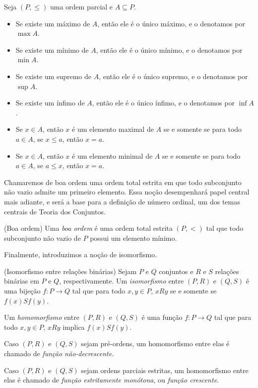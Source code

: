 \begin{proposition}[$\BST$]\label{prop:propriedadesBasicasDeOrdens}
    Seja $(P, \leq)$ uma ordem parcial e $A \subseteq P$.
    \begin{itemize}
        \item Se existe um máximo de $A$, então ele é o único máximo, e o denotamos por $\max A$.
        \item Se existe um mínimo de $A$, então ele é o único mínimo, e o denotamos por $\min A$.
        \item Se existe um supremo de $A$, então ele é o único supremo, e o denotamos por $\sup A$.
        \item Se existe um ínfimo de $A$, então ele é o único ínfimo, e o denotamos por $\inf A$.
        \item Se $x \in A$, então $x$ é um elemento maximal de $A$ se e somente se para todo $a \in A$, se $x \leq a$, então $x=a$.
        \item Se $x \in A$, então $x$ é um elemento minimal de $A$ se e somente se para todo $a \in A$, se $a \leq x$, então $x=a$.
    \end{itemize}
\end{proposition}
Chamaremos de boa ordem uma ordem total estrita em que todo subconjunto não vazio admite um primeiro elemento.
Essa noção desempenhará papel central mais adiante, e será a base para a definição de número ordinal, um dos temas centrais de Teoria dos Conjuntos.
\begin{definition}[$\BST$](Boa ordem)\label{def:boaOrdem}
    Uma \emph{boa ordem} é uma ordem total estrita $(P, <)$ tal que todo subconjunto não vazio de $P$ possui um elemento mínimo.
\end{definition}
Finalmente, introduzimos a noção de isomorfismo.
\begin{definition}[$\BST$](Isomorfismo entre relações binárias)\label{def:isomorfismoDeRelacoesBinarias}
    Sejam $P$ e $Q$ conjuntos e $R$ e $S$ relações binárias em $P$ e $Q$, respectivamente.
    Um \emph{isomorfismo} entre $(P, R)$ e $(Q, S)$ é uma bijeção $f : P \to Q$ tal que para todo $x, y \in P$, $x R y$ se e somente se $f(x) S f(y)$.

    Um \emph{homomorfismo} entre $(P, R)$ e $(Q, S)$ é uma função $f : P \to Q$ tal que para todo $x, y \in P$, $x R y$ implica $f(x) S f(y)$.

    Caso $(P, R)$ e $(Q, S)$ sejam pré-ordens, um homomorfismo entre elas é chamado de \emph{função não-decrescente}.

    Caso $(P, R)$ e $(Q, S)$ sejam ordens parciais estritas, um homomorfismo entre elas é chamado de \emph{função estritamente monótona}, ou \emph{função crescente}.
\end{definition}

